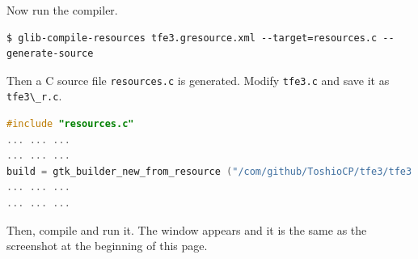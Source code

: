 Now run the compiler.

\begin{lstlisting}
$ glib-compile-resources tfe3.gresource.xml --target=resources.c --generate-source
\end{lstlisting}

Then a C source file \passthrough{\lstinline!resources.c!} is generated.
Modify \passthrough{\lstinline!tfe3.c!} and save it as
\passthrough{\lstinline!tfe3\_r.c!}.

\begin{lstlisting}[language=C]
#include "resources.c"
... ... ...
... ... ...
build = gtk_builder_new_from_resource ("/com/github/ToshioCP/tfe3/tfe3.ui");
... ... ...
... ... ...
\end{lstlisting}

Then, compile and run it. The window appears and it is the same as the
screenshot at the beginning of this page.
